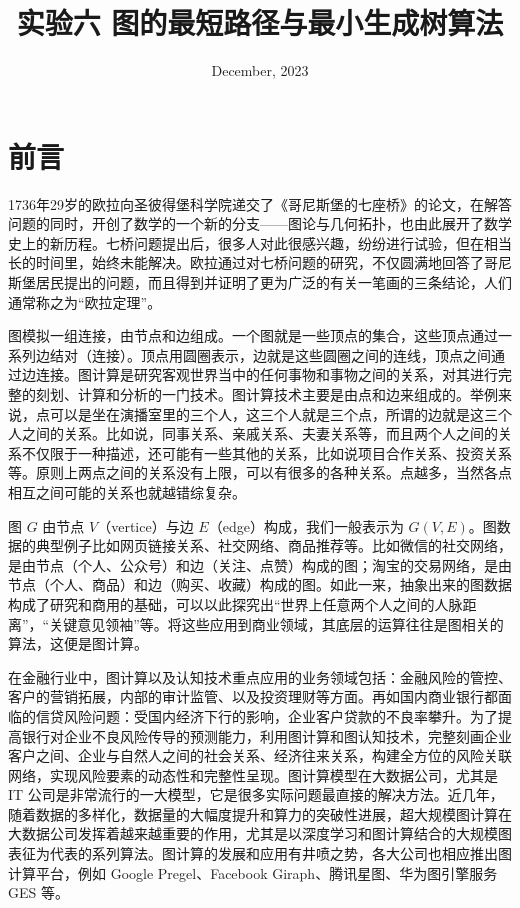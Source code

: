 \documentclass[12pt,a4paper]{article}
\title{实验六 \hspace{0.5cm} 图的最短路径与最小生成树算法}
\author{}
\date{December, 2023}
\begin{document}
\maketitle

\section{前言}
1736年29岁的欧拉向圣彼得堡科学院递交了《哥尼斯堡的七座桥》的论文，在解答问题的同时，开创了数学的一个新的分支——图论与几何拓扑，也由此展开了数学史上的新历程。七桥问题提出后，很多人对此很感兴趣，纷纷进行试验，但在相当长的时间里，始终未能解决。欧拉通过对七桥问题的研究，不仅圆满地回答了哥尼斯堡居民提出的问题，而且得到并证明了更为广泛的有关一笔画的三条结论，人们通常称之为“欧拉定理”。

图模拟一组连接，由节点和边组成。一个图就是一些顶点的集合，这些顶点通过一系列边结对（连接）。顶点用圆圈表示，边就是这些圆圈之间的连线，顶点之间通过边连接。图计算是研究客观世界当中的任何事物和事物之间的关系，对其进行完整的刻划、计算和分析的一门技术。图计算技术主要是由点和边来组成的。举例来说，点可以是坐在演播室里的三个人，这三个人就是三个点，所谓的边就是这三个人之间的关系。比如说，同事关系、亲戚关系、夫妻关系等，而且两个人之间的关系不仅限于一种描述，还可能有一些其他的关系，比如说项目合作关系、投资关系等。原则上两点之间的关系没有上限，可以有很多的各种关系。点越多，当然各点相互之间可能的关系也就越错综复杂。

图 $G$ 由节点 $V$（vertice）与边 $E$（edge）构成，我们一般表示为 $G(V,E)$。图数据的典型例子比如网页链接关系、社交网络、商品推荐等。比如微信的社交网络，是由节点（个人、公众号）和边（关注、点赞）构成的图；淘宝的交易网络，是由节点（个人、商品）和边（购买、收藏）构成的图。如此一来，抽象出来的图数据构成了研究和商用的基础，可以以此探究出“世界上任意两个人之间的人脉距离”，“关键意见领袖”等。将这些应用到商业领域，其底层的运算往往是图相关的算法，这便是图计算。

在金融行业中，图计算以及认知技术重点应用的业务领域包括：金融风险的管控、客户的营销拓展，内部的审计监管、以及投资理财等方面。再如国内商业银行都面临的信贷风险问题：受国内经济下行的影响，企业客户贷款的不良率攀升。为了提高银行对企业不良风险传导的预测能力，利用图计算和图认知技术，完整刻画企业客户之间、企业与自然人之间的社会关系、经济往来关系，构建全方位的风险关联网络，实现风险要素的动态性和完整性呈现。图计算模型在大数据公司，尤其是 IT 公司是非常流行的一大模型，它是很多实际问题最直接的解决方法。近几年，随着数据的多样化，数据量的大幅度提升和算力的突破性进展，超大规模图计算在大数据公司发挥着越来越重要的作用，尤其是以深度学习和图计算结合的大规模图表征为代表的系列算法。图计算的发展和应用有井喷之势，各大公司也相应推出图计算平台，例如 Google Pregel、Facebook Giraph、腾讯星图、华为图引擎服务 GES 等。
\end{document}
